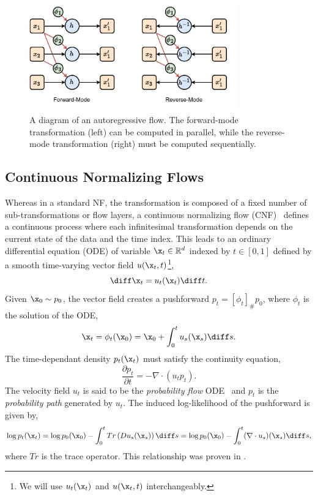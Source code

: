 \begin{figure}[ht]
    \centering
    \includegraphics[width=0.8\textwidth]{Figures/generative_models/autoreg.pdf}
    \caption{A diagram of an autoregressive flow. The forward-mode transformation (left) can be computed in parallel, while the reverse-mode transformation (right) must be computed sequentially.}
    \label{fig:autoregressive_flow}
\end{figure}

\subsection{Continuous Normalizing Flows}

Whereas in a standard NF, the transformation is composed of a fixed number of sub-transformations or flow layers, a continuous normalizing flow (CNF)~\cite{NeuralODE} defines a continuous process where each infinitesimal transformation depends on the current state of the data and the time index.
This leads to an ordinary differential equation (ODE) of variable $\x_t \in \mathbb{R}^d$ indexed by $t \in [0, 1]$ defined by a smooth time-varying vector field $u(\x_t, t)$\footnote{We will use $u_t(\x_t)$ and $u(\x_t, t)$ interchangeably.},
\begin{equation}
    \label{eq:cnf}
    \diff \x_t = u_t(\x_t) \diff t.
\end{equation}
Given $\x_0 \sim p_0$, the vector field creates a pushforward $p_t = [\phi_t]_\# p_0$, where $\phi_t$ is the solution of the ODE,
\begin{equation}
    \label{eq:cnf_pushforward}
    \x_t = \phi_t(\x_0) = \x_0 + \int_0^t u_s(\x_s) \diff s.
\end{equation}
The time-dependant density $p_t(\x_t)$ must satisfy the continuity equation,
\begin{equation}
    \label{eq:cnf_continuity}
    \frac{\partial p_t}{\partial t} = -\nabla \cdot (u_t p_t).
\end{equation}
The velocity field $u_t$ is said to be the \textit{probability flow} ODE~\cite{ScoreBasedGenerativeModeling} and $p_t$ is the \textit{probability path} generated by $u_t$.
The induced log-likelihood of the pushforward is given by,
\begin{equation}
    \label{eq:cnf_loglikelihood}
        \log p_t(\x_t)
    = \log p_0(\x_0) - \int_0^t Tr\left(D u_s(\x_s)\right)\diff s
    = \log p_0(\x_0) - \int_0^t (\nabla \cdot u_s)(\x_s) \diff s,
\end{equation}
where $Tr$ is the trace operator.
This relationship was proven in \textcite{NeuralODE}.

